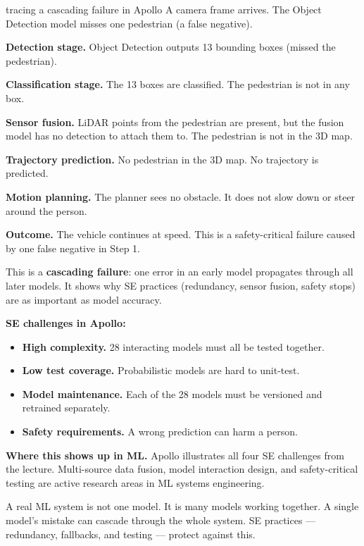 \documentclass[a4paper,11pt]{article}
\newcommand{\vocab}[1]{\textbf{\color{navy}#1}}
\begin{document}
\begin{worked}{tracing a cascading failure in Apollo}
A camera frame arrives. The Object Detection model misses one pedestrian (a false negative).
\begin{steps}
  \item \textbf{Detection stage.} Object Detection outputs 13 bounding boxes (missed the pedestrian).
  \item \textbf{Classification stage.} The 13 boxes are classified. The pedestrian is not in any box.
  \item \textbf{Sensor fusion.} LiDAR points from the pedestrian are present, but the fusion model
        has no detection to attach them to. The pedestrian is not in the 3D map.
  \item \textbf{Trajectory prediction.} No pedestrian in the 3D map. No trajectory is predicted.
  \item \textbf{Motion planning.} The planner sees no obstacle. It does not slow down or steer around the person.
  \item \textbf{Outcome.} The vehicle continues at speed. This is a safety-critical failure caused by one false negative in Step 1.
\end{steps}
This is a \vocab{cascading failure}: one error in an early model propagates through all later models.
It shows why SE practices (redundancy, sensor fusion, safety stops) are as important as model accuracy.
\end{worked}

\noindent\textbf{SE challenges in Apollo:}
\begin{itemize}
  \item \textbf{High complexity.} 28 interacting models must all be tested together.
  \item \textbf{Low test coverage.} Probabilistic models are hard to unit-test.
  \item \textbf{Model maintenance.} Each of the 28 models must be versioned and retrained separately.
  \item \textbf{Safety requirements.} A wrong prediction can harm a person.
\end{itemize}

\noindent\textbf{Where this shows up in ML.}
Apollo illustrates all four SE challenges from the lecture.
Multi-source data fusion, model interaction design, and safety-critical testing are active research areas in ML systems engineering.

\begin{keytake}
A real ML system is not one model.
It is many models working together.
A single model's mistake can cascade through the whole system.
SE practices --- redundancy, fallbacks, and testing --- protect against this.
\end{keytake}
\end{document}
